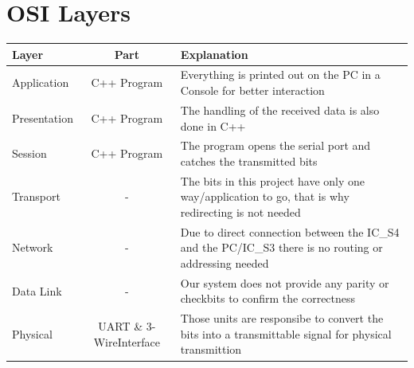 \documentclass[12pt,a4 paper] {report}
\begin{document}
\newpage

\section*{OSI Layers}
\begin{center}
	\begin{tabular}{ | p{2cm} | c | p{5cm} |}
		\hline
		\textbf{Layer} & \textbf{Part} & \textbf{Explanation} \\
		\hline
  	Application & C++ Program &  Everything is printed out on the PC in a Console for better interaction \\
  	\hline
		Presentation & C++ Program & The handling of the received data is also done in C++ \\
		\hline
		Session & C++ Program & The program opens the serial port and catches the transmitted bits \\
		\hline
		Transport & - & The bits in this project have only one way/application to go, that is why redirecting is not needed \\
		\hline
		Network & - & Due to direct connection between the IC\_S4 and the PC/IC\_S3 there is no routing or addressing needed \\
		\hline
		Data Link & - & Our system does not provide any parity or checkbits to confirm the correctness \\
		\hline
		Physical & UART \& 3-WireInterface & Those units are responsibe to convert the bits into a transmittable signal for physical transmittion \\
		\hline
	\end{tabular}
\end{center}

\newpage
\end{document}

